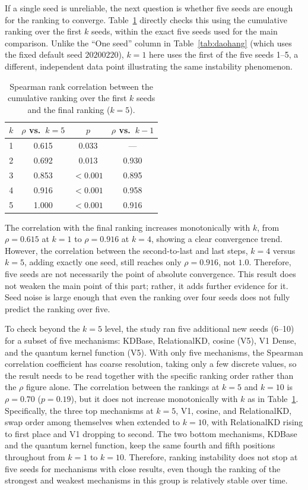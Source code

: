 If a single seed is unreliable, the next question is whether five
seeds are enough for the ranking to converge. Table~\ref{tab:hoitu}
directly checks this using the cumulative ranking over the first $k$
seeds, within the exact five seeds used for the main comparison.
Unlike the ``One seed'' column in Table~\ref{tab:daohang} (which
uses the fixed default seed $20200220$), $k=1$ here uses the first
of the five seeds 1--5, a different, independent data point
illustrating the same instability phenomenon.

\begin{table}[!htbp]
\centering
\caption{Spearman rank correlation between the cumulative ranking
over the first $k$ seeds and the final ranking ($k=5$).}
\label{tab:hoitu}
\begin{tabular}{cccc}
\toprule
$k$ & $\rho$ vs.\ $k=5$ & $p$ & $\rho$ vs.\ $k-1$ \\
\midrule
1 & 0.615 & 0.033 & --- \\
2 & 0.692 & 0.013 & 0.930 \\
3 & 0.853 & $<0.001$ & 0.895 \\
4 & 0.916 & $<0.001$ & 0.958 \\
5 & 1.000 & $<0.001$ & 0.916 \\
\bottomrule
\end{tabular}
\end{table}
\FloatBarrier

The correlation with the final ranking increases monotonically with
$k$, from $\rho=0.615$ at $k=1$ to $\rho=0.916$ at $k=4$, showing a
clear convergence trend. However, the correlation between the
second-to-last and last steps, $k=4$ versus $k=5$, adding exactly
one seed, still reaches only $\rho=0.916$, not $1.0$. Therefore,
five seeds are not necessarily the point of absolute convergence.
This result does not weaken the main point of this part; rather, it
adds further evidence for it. Seed noise is large enough that even
the ranking over four seeds does not fully predict the ranking over
five.

To check beyond the $k=5$ level, the study ran five additional new
seeds (6--10) for a subset of five mechanisms: KDBase, RelationalKD,
cosine (V5), V1 Dense, and the quantum kernel function (V5). With
only five mechanisms, the Spearman correlation coefficient has
coarse resolution, taking only a few discrete values, so the result
needs to be read together with the specific ranking order rather
than the $\rho$ figure alone. The correlation between the rankings
at $k=5$ and $k=10$ is $\rho=0.70$ ($p=0.19$), but it does not
increase monotonically with $k$ as in Table~\ref{tab:hoitu}.
Specifically, the three top mechanisms at $k=5$, V1, cosine, and
RelationalKD, swap order among themselves when extended to $k=10$,
with RelationalKD rising to first place and V1 dropping to second.
The two bottom mechanisms, KDBase and the quantum kernel function,
keep the same fourth and fifth positions throughout from $k=1$ to
$k=10$. Therefore, ranking instability does not stop at five seeds
for mechanisms with close results, even though the ranking of the
strongest and weakest mechanisms in this group is relatively stable
over time.


